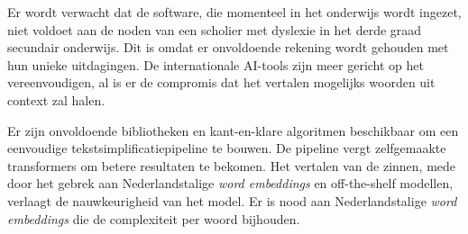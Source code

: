 Er wordt verwacht dat de software, die momenteel in het onderwijs wordt ingezet, niet voldoet aan de noden van een scholier met dyslexie in het derde graad secundair onderwijs. Dit is omdat er onvoldoende rekening wordt gehouden met hun unieke uitdagingen. De internationale AI-tools zijn meer gericht op het vereenvoudigen, al is er de compromis dat het vertalen mogelijks woorden uit context zal halen. 

Er zijn onvoldoende bibliotheken en kant-en-klare algoritmen beschikbaar om een eenvoudige tekstsimplificatiepipeline te bouwen. De pipeline vergt zelfgemaakte transformers om betere resultaten te bekomen. Het vertalen van de zinnen, mede door het gebrek aan Nederlandstalige \textit{word embeddings} en off-the-shelf modellen, verlaagt de nauwkeurigheid van het model. Er is nood aan Nederlandstalige \textit{word embeddings} die de complexiteit per woord bijhouden. 


